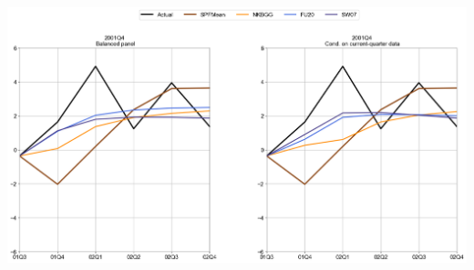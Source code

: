 \documentclass{article}
\begin{document}
\includegraphics[scale=0.5]{Top3_models_2001Q4}\\ \bigskip \\ \bigskip  \\
\end{document}

